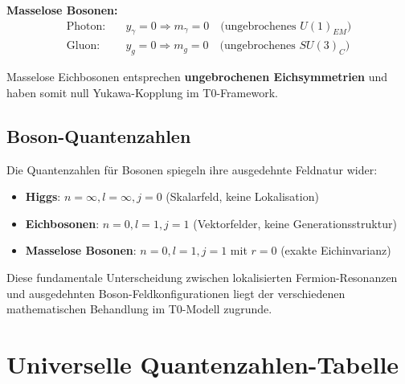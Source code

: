 \documentclass[12pt,a4paper]{article}
\begin{document}
	\textbf{Masselose Bosonen:}
	\begin{align}
		\text{Photon:} \quad &y_\gamma = 0 \Rightarrow m_\gamma = 0 \quad \text{(ungebrochenes $U(1)_{EM}$)} \\
		\text{Gluon:} \quad &y_g = 0 \Rightarrow m_g = 0 \quad \text{(ungebrochenes $SU(3)_C$)}
	\end{align}
	
	Masselose Eichbosonen entsprechen \textbf{ungebrochenen Eichsymmetrien} und haben somit null Yukawa-Kopplung im T0-Framework.
	
	\subsection{Boson-Quantenzahlen}
	\label{subsec:boson_quantum_numbers}
	
	Die Quantenzahlen für Bosonen spiegeln ihre ausgedehnte Feldnatur wider:
	
	\begin{itemize}
		\item \textbf{Higgs}: $n = \infty, l = \infty, j = 0$ (Skalarfeld, keine Lokalisation)
		\item \textbf{Eichbosonen}: $n = 0, l = 1, j = 1$ (Vektorfelder, keine Generationsstruktur)
		\item \textbf{Masselose Bosonen}: $n = 0, l = 1, j = 1$ mit $r = 0$ (exakte Eichinvarianz)
	\end{itemize}
	
	Diese fundamentale Unterscheidung zwischen lokalisierten Fermion-Resonanzen und ausgedehnten Boson-Feldkonfigurationen liegt der verschiedenen mathematischen Behandlung im T0-Modell zugrunde.
	
	\section{Universelle Quantenzahlen-Tabelle}
	\label{sec:universal_quantum_numbers}
	
\end{document}
